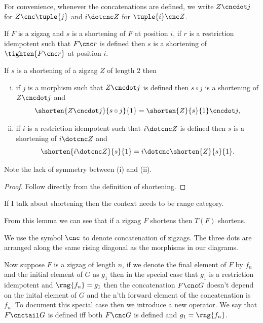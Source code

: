 For convenience, 
whenever the concatenations are defined, we write
$Z \cncdot j$ for $Z \cnc \tuple{j}$ and
$i \dotcnc Z$ for $\tuple{i} \cnc Z$.

\begin{corollary}
If $F$ is a zigzag and $s$ is a shortening of $F$ at position $i$,
if $r$ is a restriction idempotent such that $F \cnc r$ is defined
then $s$ is a shortening of $\tighten{F\cnc r}$ at position $i$.
\end{corollary}

\begin{lemma}
If $s$ is a shortening of a zigzag $Z$  of length $2$
then
\begin{enumerate}[(i)]
\item
 if $j$ is a morphism 
 such that $Z \cncdot j$  is defined
 then $s \circ j$ is a shortening of $Z \cncdot j$ and
 \[
 \shorten{Z \cncdot j}{s \circ j}{1} 
                       = \shorten{Z}{s}{1} \cncdot j,
 \] 
 \item
 if $i$ is a restriction idempotent 
 such that $i \dotcnc Z$  is defined
 then $s$ is a shortening of $i \dotcnc Z$ and
 \[
 \shorten{i \dotcnc Z}{s}{1}
                        = i \dotcnc \shorten{Z}{s}{1}.
 \] 
\end{enumerate}
Note the lack of symmetry between (i) and (ii). 
\end{lemma}
\begin{proof}
Follow directly from the definition of shortening.
\end{proof}

\begin{aside}
If I talk about shortening then the context
needs to be  range category.
\end{aside}


From this lemma we can see that if a zigzag $F$ shortens then $T(F)$ shortens.

\newcommand{\zigzagIsolationTailTuple}[3]
{
\tuple{\rng{#1_{#2+1}},#1'_{#2+1},...#1'_{#3-1},#1_{#3}} 
}
\begin{newtt}
We use the symbol $\cnc$ to denote concatenation of zigzags. The three dots are arranged along the same rising diagonal as the morphisms in our diagrams. 

Now suppose $F$ is a zigzag of length $n$, if we denote the final element of $F$ by $f_n$ and the initial element of
$G$ as $g_1$ then in the special case that $g_1$ is a restriction 
idempotent and  $\rng{f_n}=g_1$ then the concatenation
$F \cnc G$ doesn't depend on the inital element of $G$ and the n'th
forward element of the concatenation is $f_n$. To
document this special case then we introduce a new operator.
We say that $F \cnctail G$ is defined iff 
both $F \cnc G$ is defined and  $g_1 = \rng{f_n}$.
\end{newtt}

